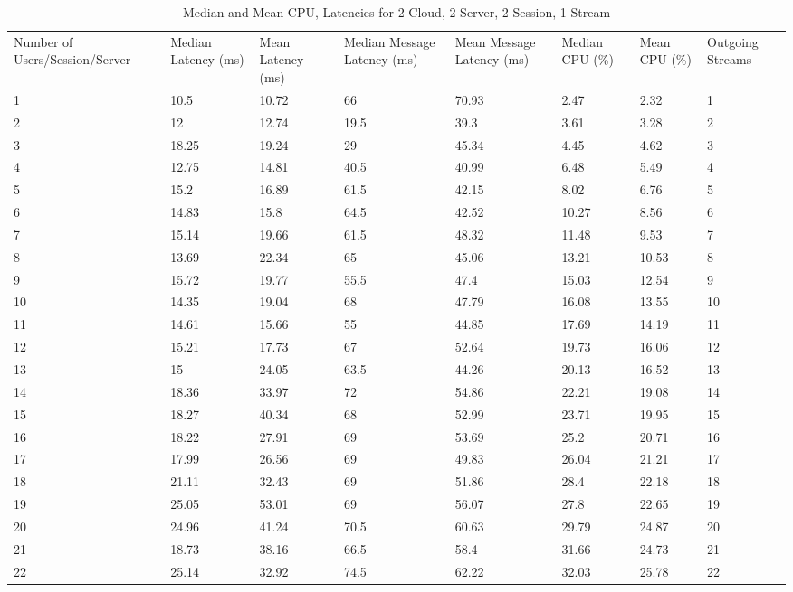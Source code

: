 \begin{table}
\caption{Median and Mean CPU, Latencies for 2 Cloud, 2 Server, 2 Session, 1 Stream}
\label{table:2cld_2serv_2sess_1str}
\begin{tabu} to\linewidth{|X[c]|X[c]|X[c]|X[c]|X[c]|X[c]|X[c]|X[c]|}
\everyrow{\hline}
\hline
Number of Users/Session/Server & Median Latency (ms) & Mean Latency (ms) & Median Message Latency (ms) & Mean Message Latency (ms) & Median CPU (\%) & Mean CPU (\%) & Outgoing Streams\\
1 & 10.5 & 10.72 & 66 & 70.93 & 2.47 & 2.32 & 1 \\
2 & 12 & 12.74 & 19.5 & 39.3 & 3.61 & 3.28 & 2 \\
3 & 18.25 & 19.24 & 29 & 45.34 & 4.45 & 4.62 & 3 \\
4 & 12.75 & 14.81 & 40.5 & 40.99 & 6.48 & 5.49 & 4 \\
5 & 15.2 & 16.89 & 61.5 & 42.15 & 8.02 & 6.76 & 5 \\
6 & 14.83 & 15.8 & 64.5 & 42.52 & 10.27 & 8.56 & 6 \\
7 & 15.14 & 19.66 & 61.5 & 48.32 & 11.48 & 9.53 & 7 \\
8 & 13.69 & 22.34 & 65 & 45.06 & 13.21 & 10.53 & 8 \\
9 & 15.72 & 19.77 & 55.5 & 47.4 & 15.03 & 12.54 & 9 \\
10 & 14.35 & 19.04 & 68 & 47.79 & 16.08 & 13.55 & 10 \\
11 & 14.61 & 15.66 & 55 & 44.85 & 17.69 & 14.19 & 11 \\
12 & 15.21 & 17.73 & 67 & 52.64 & 19.73 & 16.06 & 12 \\
13 & 15 & 24.05 & 63.5 & 44.26 & 20.13 & 16.52 & 13 \\
14 & 18.36 & 33.97 & 72 & 54.86 & 22.21 & 19.08 & 14 \\
15 & 18.27 & 40.34 & 68 & 52.99 & 23.71 & 19.95 & 15 \\
16 & 18.22 & 27.91 & 69 & 53.69 & 25.2 & 20.71 & 16 \\
17 & 17.99 & 26.56 & 69 & 49.83 & 26.04 & 21.21 & 17 \\
18 & 21.11 & 32.43 & 69 & 51.86 & 28.4 & 22.18 & 18 \\
19 & 25.05 & 53.01 & 69 & 56.07 & 27.8 & 22.65 & 19 \\
20 & 24.96 & 41.24 & 70.5 & 60.63 & 29.79 & 24.87 & 20 \\
21 & 18.73 & 38.16 & 66.5 & 58.4 & 31.66 & 24.73 & 21 \\
22 & 25.14 & 32.92 & 74.5 & 62.22 & 32.03 & 25.78 & 22 \\

\end{tabu}
\end{table}
